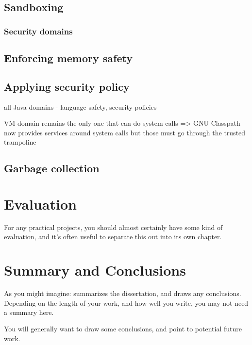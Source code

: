 \documentclass[a4paper,12pt,twoside,openright]{report}
\begin{document}
\section{Sandboxing}

\subsection{Security domains}

\section{Enforcing memory safety}

\section{Applying security policy}

all Java domains - language safety, security policies

VM domain remains the only one that can do system calls => GNU Classpath now provides services around system calls but those must go through the trusted trampoline

\section{Garbage collection}

\chapter{Evaluation} 

For any practical projects, you should almost certainly have
some kind of evaluation, and it's often useful to separate 
this out into its own chapter. 


\chapter{Summary and Conclusions} 

As you might imagine: summarizes the dissertation, and draws 
any conclusions. Depending on the length of your work, and 
how well you write, you may not need a summary here. 

You will generally want to draw some conclusions, and point
to potential future work. 




\appendix
\singlespacing

 
 
\end{document}
